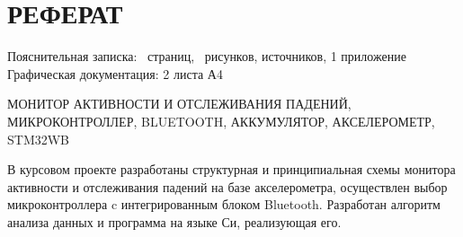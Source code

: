 \begin{sloppypar} %
\newpage %
\section*{РЕФЕРАТ} %

Пояснительная записка: \pageref*{LastPage}~страниц, \totfig~рисунков, источников, 1 приложение
Графическая документация: 2 листа А4



МОНИТОР АКТИВНОСТИ И ОТСЛЕЖИВАНИЯ ПАДЕНИЙ, МИКРОКОНТРОЛЛЕР, BLUETOOTH, АККУМУЛЯТОР, АКСЕЛЕРОМЕТР, STM32WB


В курсовом проекте разработаны структурная и принципиальная схемы монитора активности и отслеживания падений на базе акселерометра, осуществлен выбор микроконтроллера c интегрированным блоком Bluetooth.  Разработан алгоритм анализа данных и программа на языке Си, реализующая его.

\end{sloppypar}
